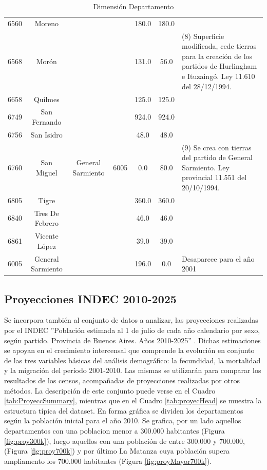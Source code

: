 \documentclass{article}
\theoremstyle{mytheoremstyle}
\theoremstyle{mytheoremstyle}
\theoremstyle{myproblemstyle}
\begin{document}
\begin{table}[htbp]
\begin{tabular}{|c|c|c|c|c|c|p{5cm}|}
        6560 & Moreno              &&& 180.0             & 180.0 & \\
        6568 & Morón                &&& 131.0             & 56.0  & (8) Superficie  modificada, cede tierras para la creación de los partidos de Hurlingham e Ituzaingó. Ley 11.610 del 28/12/1994.\\
        6658 & Quilmes            && & 125.0             & 125.0 &       \\
        6749 & San Fernando       && & 924.0             & 924.0 &    \\
        6756 & San Isidro         && & 48.0              & 48.0  &    \\
        6760 & San Miguel          & General Sarmiento & 6005  & 0.0 & 80.0 & (9) Se crea con tierras del partido de General Sarmiento. Ley provincial 11.551 del 20/10/1994. \\
        6805 & Tigre            &&   & 360.0             & 360.0 &     \\
        6840 & Tres De Febrero   &&  & 46.0              & 46.0  &      \\
        6861 & Vicente López     &&  & 39.0              & 39.0  &  \\
        6005 & General Sarmiento  && & 196.0             & 0.0   & Desaparece para el año 2001   \\        
     \hline
    \end{tabular}
   \caption{Dimensión Departamento}
    \label{tab:DimDepto}
\end{table}

\subsection{Proyecciones INDEC 2010-2025}
Se incorpora también al conjunto de datos a analizar, las proyecciones realizadas por el INDEC ''Población estimada al 1 de julio de
 cada año calendario por sexo, según partido. Provincia de Buenos Aires. Años 2010-2025'' .
 Dichas estimaciones se apoyan en el crecimiento intercensal que comprende la evolución en conjunto
 de las tres variables básicas del análisis demográfico: la fecundidad, la mortalidad y la migración del período 2001-2010.  
Las mismas se utilizarán para comparar los resultados de los censos, acompañadas de
 proyecciones realizadas por otros métodos.\newline\newline
 La  descripción de este conjunto  puede verse en el Cuadro \ref{tab:ProyeccSummary}, mientras que en el Cuadro \ref{tab:proyecHead} se muestra la estructura típica del 
 dataset. En forma gráfica se dividen los departamentos según la población inicial para el año 2010. 
 Se grafica, por un lado aquellos departamentos con una poblacion menor a 300.000 habitantes (Figura \ref{fig:proy300k}), luego aquellos con una población de entre 300.000 y 700.000,
  (Figura \ref{fig:proy700k}) y por último La Matanza cuya población supera ampliamento los 700.000 habitantes (Figura \ref{fig:proyMayor700k}).
\end{document}

